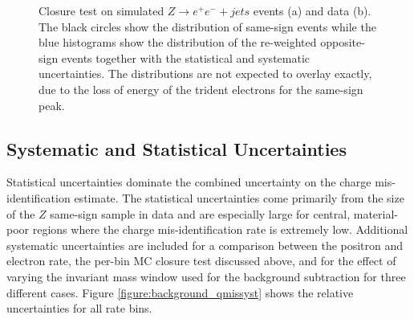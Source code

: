 \begin{figure}[htb!]
\begin{minipage}[h]{0.5\textwidth}
\end{minipage}\hfill
  \caption{Closure test on simulated $Z\rightarrow e^+e^-+jets$ events (a)   and data (b). 
      The black circles show the distribution of same-sign events while the blue histograms
      show the distribution of the re-weighted opposite-sign events together with the statistical and systematic uncertainties. The distributions are not
    expected to overlay exactly, due to the loss of energy of the trident electrons for the
    same-sign peak. \label{figure:background_clMll}}
\end{figure}


\subsection{Systematic and Statistical Uncertainties}

Statistical uncertainties dominate the combined uncertainty on the charge mis-identification estimate. The statistical uncertainties come primarily from the size of the $Z$ same-sign sample in data and are especially large for central, material-poor regions where the charge mis-identification rate is extremely low. Additional systematic uncertainties are included for a comparison between the positron and electron rate, the per-bin MC closure test discussed above, and for the effect of varying the invariant mass window used for the background subtraction for three different cases. Figure \ref{figure:background_qmissyst} shows the relative uncertainties for all rate bins.



